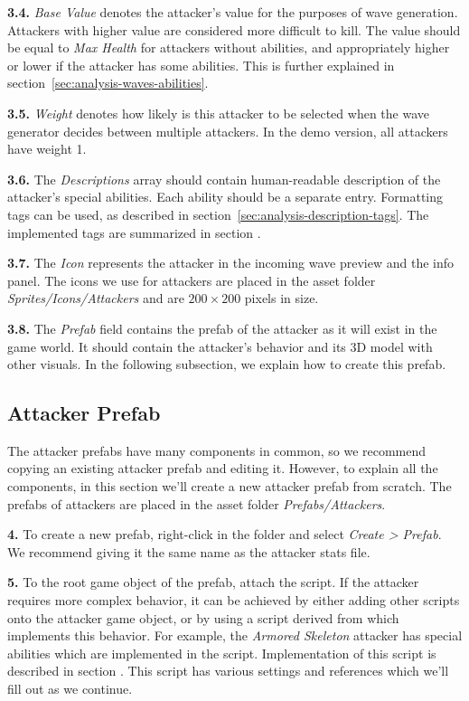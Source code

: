 \textbf{3.4.}
\emph{Base Value} denotes the attacker's value for the purposes of wave generation.
Attackers with higher value are considered more difficult to kill.
The value should be equal to \emph{Max Health} for attackers without abilities, and appropriately higher or lower if the attacker has some abilities.
This is further explained in section~\ref{sec:analysis-waves-abilities}.

\textbf{3.5.}
\emph{Weight} denotes how likely is this attacker to be selected when the wave generator decides between multiple attackers.
In the demo version, all attackers have weight 1.

\textbf{3.6.}
The \emph{Descriptions} array should contain human-readable description of the attacker's special abilities.
Each ability should be a separate entry.
Formatting tags can be used, as described in section~\ref{sec:analysis-description-tags}.
The implemented tags are summarized in section .

\textbf{3.7.}
The \emph{Icon} represents the attacker in the incoming wave preview and the info panel.
The icons we use for attackers are placed in the asset folder \emph{Sprites/Icons/Attackers} and are $200\times200$ pixels in size.

\textbf{3.8.}
The \emph{Prefab} field contains the prefab of the attacker as it will exist in the game world.
It should contain the attacker's behavior and its 3D model with other visuals.
In the following subsection, we explain how to create this prefab.

\subsection{Attacker Prefab}

The attacker prefabs have many components in common, so we recommend copying an existing attacker prefab and editing it.
However, to explain all the components, in this section we'll create a new attacker prefab from scratch.
The prefabs of attackers are placed in the asset folder \emph{Prefabs/Attackers}.

\textbf{4.}
To create a new prefab, right-click in the folder and select \emph{Create > Prefab}.
We recommend giving it the same name as the attacker stats file.

\textbf{5.}
To the root game object of the prefab, attach the  script.
If the attacker requires more complex behavior, it can be achieved by either adding other scripts onto the attacker game object, or by using a script derived from  which implements this behavior.
For example, the \emph{Armored Skeleton} attacker has special abilities which are implemented in the  script.
Implementation of this script is described in section .
This script has various settings and references which we'll fill out as we continue.

